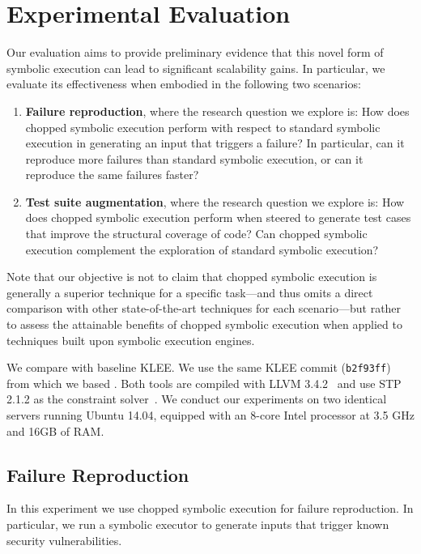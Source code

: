 
\chapter{Experimental Evaluation}\label{chapter:experiments}

Our evaluation aims to provide preliminary evidence that this novel
form of symbolic execution can lead to significant scalability
gains. In particular, we evaluate its effectiveness when embodied in
the following two scenarios:

\begin{enumerate}[leftmargin=*]
\item \textbf{Failure reproduction}, where the research question we
  explore is: How does chopped symbolic execution perform with respect
  to standard symbolic execution in generating an input that triggers
  a failure? In particular, can it reproduce more failures than standard
  symbolic execution, or can it reproduce the same failures faster?

\item \textbf{Test suite augmentation}, where the research question we
  explore is: How does chopped symbolic execution perform when steered
  to generate test cases that improve the structural coverage of code?
  Can chopped symbolic execution complement the exploration of
  standard symbolic execution?
\end{enumerate}

Note that our objective is not to claim that chopped symbolic
execution is generally a superior technique for a specific task---and
thus omits a direct comparison with other state-of-the-art techniques
for each scenario---but rather to assess the attainable benefits of
chopped symbolic execution when applied to techniques built upon
symbolic execution engines.

We compare \toolname with baseline KLEE. We use the same KLEE commit
(\texttt{b2f93ff}) from which we based \toolname.  Both tools are
compiled with LLVM 3.4.2~\cite{llvm} and use STP 2.1.2 as the
constraint solver~\cite{stp}. We conduct our experiments on two
identical servers running Ubuntu 14.04, equipped with an 8-core Intel
processor at 3.5 GHz and 16GB of RAM.

\section{Failure Reproduction}\label{sec:disc-secur-vuln}
In this experiment we use chopped symbolic execution for failure
reproduction. In particular, we run a symbolic executor to generate
inputs that trigger known security vulnerabilities.

